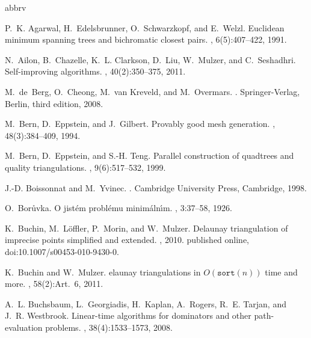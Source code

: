 \documentclass[11pt]{paper}
\begin{document}
 {abbrv}
\newcommand{\SortNoop}[1]{}
\begin{thebibliography}{10}

P.~K. Agarwal, H.~Edelsbrunner, O.~Schwarzkopf, and E.~Welzl.
\newblock Euclidean minimum spanning trees and bichromatic closest pairs.
, 6(5):407--422, 1991.

N.~Ailon, B.~Chazelle, K.~L. Clarkson, D.~Liu, W.~Mulzer, and C.~Seshadhri.
\newblock Self-improving algorithms.
, 40(2):350--375, 2011.

M.~{\SortNoop{Berg}}de~Berg, O.~Cheong, M.~van Kreveld, and M.~Overmars.
.
\newblock Springer-Verlag, Berlin, third edition, 2008.

M.~Bern, D.~Eppstein, and J.~Gilbert.
\newblock Provably good mesh generation.
, 48(3):384--409, 1994.

M.~Bern, D.~Eppstein, and S.-H. Teng.
\newblock Parallel construction of quadtrees and quality triangulations.
, 9(6):517--532, 1999.

J.-D. Boissonnat and M.~Yvinec.
.
\newblock Cambridge University Press, Cambridge, 1998.

O.~Bor\r{u}vka.
\newblock O jist\'em probl\'emu minim\'aln\'{\i}m.
, 3:37--58, 1926.

K.~Buchin, M.~L{\"o}ffler, P.~Morin, and W.~Mulzer.
\newblock Delaunay triangulation of imprecise points simplified and extended.
, 2010.
\newblock published online, doi:10.1007/s00453-010-9430-0.

K.~Buchin and W.~Mulzer.
elaunay triangulations in ${O}(\texttt{sort}(n))$ time and more.
, 58(2):Art.~6, 2011.

A.~L. Buchsbaum, L.~Georgiadis, H.~Kaplan, A.~Rogers, R.~E. Tarjan, and J.~R.
  Westbrook.
\newblock Linear-time algorithms for dominators and other path-evaluation
  problems.
, 38(4):1533--1573, 2008.


\end{thebibliography}
\end{document}
